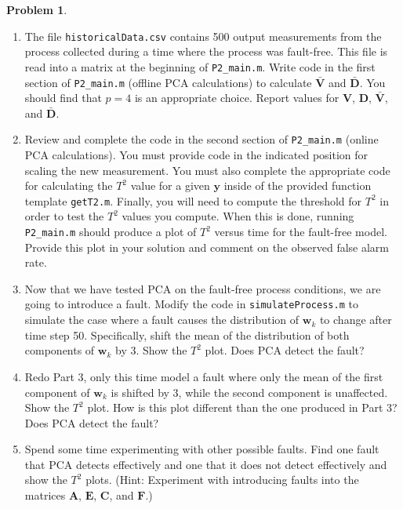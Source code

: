 \documentclass[14pt]{article}
\theoremstyle{definition}
\newtheorem{problem}{Problem}
\newcommand{\0}{\ensuremath{\mathbf{0}}}
\newcommand{\bs}[1]{\ensuremath{\mathbf{#1}}}
\begin{document}
\begin{problem}
\begin{enumerate}
\item The file \verb+historicalData.csv+ contains 500 output measurements from the process collected during a time where the process was fault-free. This file is read into a matrix at the beginning of \verb+P2_main.m+. Write code in the first section of \verb+P2_main.m+ (offline PCA calculations) to calculate $\bar{\bs{V}}$ and $\bar{\bs{D}}$. You should find that $p=4$ is an appropriate choice. Report values for $\bs{V}$, $\bs{D}$, $\bar{\bs{V}}$, and $\bar{\bs{D}}$.
\item Review and complete the code in the second section of \verb+P2_main.m+ (online PCA calculations). You must provide code in the indicated position for scaling the new measurement. You must also complete the appropriate code for calculating the $T^2$ value for a given $\bs{y}$ inside of the provided function template \verb+getT2.m+. Finally, you will need to compute the threshold for $T^2$ in order to test the $T^2$ values you compute. When this is done, running \verb+P2_main.m+ should produce a plot of $T^2$ versus time for the fault-free model. Provide this plot in your solution and comment on the observed false alarm rate.
\item Now that we have tested PCA on the fault-free process conditions, we are going to introduce a fault. Modify the code in \verb+simulateProcess.m+ to simulate the case where a fault causes the distribution of $\bs{w}_k$ to change after time step 50. Specifically, shift the mean of the distribution of both components of $\bs{w}_k$ by 3. Show the $T^2$ plot. Does PCA detect the fault?
\item Redo Part 3, only this time model a fault where only the mean of the first component of $\bs{w}_k$ is shifted by 3, while the second component is unaffected. Show the $T^2$ plot. How is this plot different than the one produced in Part 3? Does PCA detect the fault?  
\item Spend some time experimenting with other possible faults. Find one fault that PCA detects effectively and one that it does not detect effectively and show the $T^2$ plots. (Hint: Experiment with introducing faults into the matrices $\bs{A}$, $\bs{E}$, $\bs{C}$, and $\bs{F}$.)
\end{enumerate}
\end{problem}

 

\end{document}
